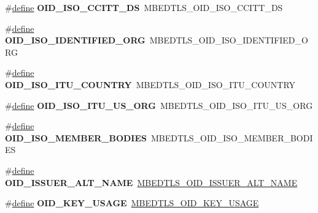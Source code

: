 \begin{DoxyCompactItemize}
\item 
\mbox{\label{compat-1_83_8h_a808ab56c59c6d3873ab81f18af7c9e03}} 
\#\hyperlink{structdefine}{define} {\bfseries O\+I\+D\+\_\+\+I\+S\+O\+\_\+\+C\+C\+I\+T\+T\+\_\+\+DS}~M\+B\+E\+D\+T\+L\+S\+\_\+\+O\+I\+D\+\_\+\+I\+S\+O\+\_\+\+C\+C\+I\+T\+T\+\_\+\+DS
\item 
\mbox{\label{compat-1_83_8h_a6b6756e93042d2732d1531e24530b350}} 
\#\hyperlink{structdefine}{define} {\bfseries O\+I\+D\+\_\+\+I\+S\+O\+\_\+\+I\+D\+E\+N\+T\+I\+F\+I\+E\+D\+\_\+\+O\+RG}~M\+B\+E\+D\+T\+L\+S\+\_\+\+O\+I\+D\+\_\+\+I\+S\+O\+\_\+\+I\+D\+E\+N\+T\+I\+F\+I\+E\+D\+\_\+\+O\+RG
\item 
\mbox{\label{compat-1_83_8h_a4ca9af47144a961306ecb4abc9b69f52}} 
\#\hyperlink{structdefine}{define} {\bfseries O\+I\+D\+\_\+\+I\+S\+O\+\_\+\+I\+T\+U\+\_\+\+C\+O\+U\+N\+T\+RY}~M\+B\+E\+D\+T\+L\+S\+\_\+\+O\+I\+D\+\_\+\+I\+S\+O\+\_\+\+I\+T\+U\+\_\+\+C\+O\+U\+N\+T\+RY
\item 
\mbox{\label{compat-1_83_8h_ae58efad2f780dc751fb2e1b5d9ee6c8d}} 
\#\hyperlink{structdefine}{define} {\bfseries O\+I\+D\+\_\+\+I\+S\+O\+\_\+\+I\+T\+U\+\_\+\+U\+S\+\_\+\+O\+RG}~M\+B\+E\+D\+T\+L\+S\+\_\+\+O\+I\+D\+\_\+\+I\+S\+O\+\_\+\+I\+T\+U\+\_\+\+U\+S\+\_\+\+O\+RG
\item 
\mbox{\label{compat-1_83_8h_a43449224983a1f2892271cdd5eb6f6ef}} 
\#\hyperlink{structdefine}{define} {\bfseries O\+I\+D\+\_\+\+I\+S\+O\+\_\+\+M\+E\+M\+B\+E\+R\+\_\+\+B\+O\+D\+I\+ES}~M\+B\+E\+D\+T\+L\+S\+\_\+\+O\+I\+D\+\_\+\+I\+S\+O\+\_\+\+M\+E\+M\+B\+E\+R\+\_\+\+B\+O\+D\+I\+ES
\item 
\mbox{\label{compat-1_83_8h_a0fa52faeca19b41e7f3319ce6106d050}} 
\#\hyperlink{structdefine}{define} {\bfseries O\+I\+D\+\_\+\+I\+S\+S\+U\+E\+R\+\_\+\+A\+L\+T\+\_\+\+N\+A\+ME}~\hyperlink{oid_8h_aeea9acd528a40c3630b42d9ec4162ce4}{M\+B\+E\+D\+T\+L\+S\+\_\+\+O\+I\+D\+\_\+\+I\+S\+S\+U\+E\+R\+\_\+\+A\+L\+T\+\_\+\+N\+A\+ME}
\item 
\mbox{\label{compat-1_83_8h_ac20f4cba8a0469b367cb95ae0e92c059}} 
\#\hyperlink{structdefine}{define} {\bfseries O\+I\+D\+\_\+\+K\+E\+Y\+\_\+\+U\+S\+A\+GE}~\hyperlink{oid_8h_a6d7556c43f7fc4f3af5bbdfd26cb2620}{M\+B\+E\+D\+T\+L\+S\+\_\+\+O\+I\+D\+\_\+\+K\+E\+Y\+\_\+\+U\+S\+A\+GE}

\end{DoxyCompactItemize}
